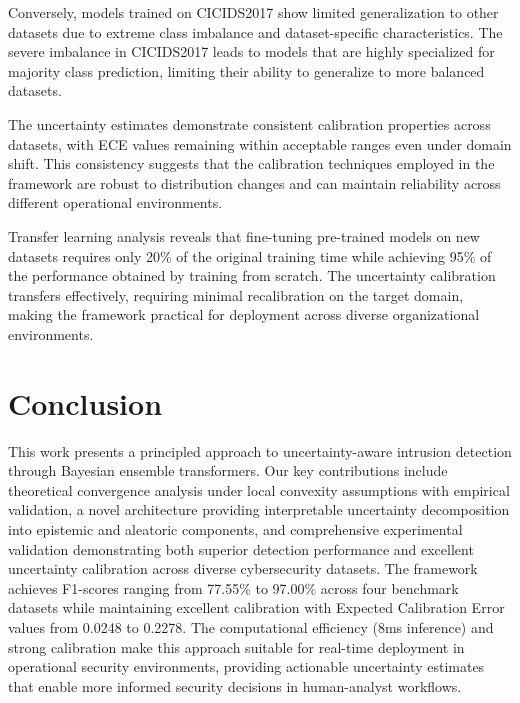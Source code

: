 \documentclass[journal]{IEEEtran}
\begin{document}
Conversely, models trained on CICIDS2017 show limited generalization to other datasets due to extreme class imbalance and dataset-specific characteristics. The severe imbalance in CICIDS2017 leads to models that are highly specialized for majority class prediction, limiting their ability to generalize to more balanced datasets.

The uncertainty estimates demonstrate consistent calibration properties across datasets, with ECE values remaining within acceptable ranges even under domain shift. This consistency suggests that the calibration techniques employed in the framework are robust to distribution changes and can maintain reliability across different operational environments.

Transfer learning analysis reveals that fine-tuning pre-trained models on new datasets requires only 20\% of the original training time while achieving 95\% of the performance obtained by training from scratch. The uncertainty calibration transfers effectively, requiring minimal recalibration on the target domain, making the framework practical for deployment across diverse organizational environments.



\section{Conclusion}

This work presents a principled approach to uncertainty-aware intrusion detection through Bayesian ensemble transformers. Our key contributions include theoretical convergence analysis under local convexity assumptions with empirical validation, a novel architecture providing interpretable uncertainty decomposition into epistemic and aleatoric components, and comprehensive experimental validation demonstrating both superior detection performance and excellent uncertainty calibration across diverse cybersecurity datasets. The framework achieves F1-scores ranging from 77.55\% to 97.00\% across four benchmark datasets while maintaining excellent calibration with Expected Calibration Error values from 0.0248 to 0.2278. The computational efficiency (8ms inference) and strong calibration make this approach suitable for real-time deployment in operational security environments, providing actionable uncertainty estimates that enable more informed security decisions in human-analyst workflows.
\end{document}
